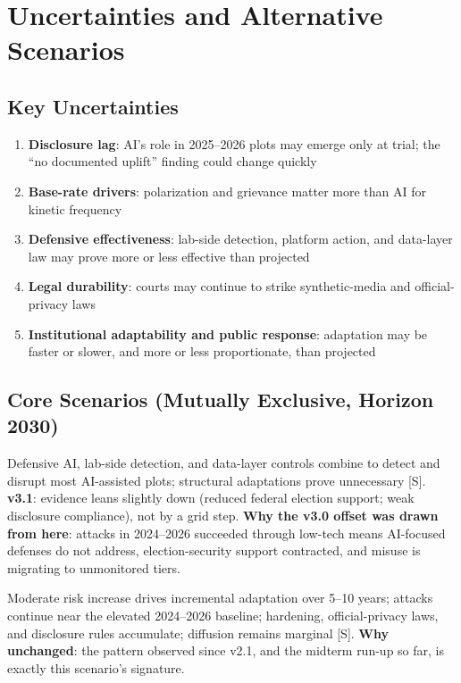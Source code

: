 \documentclass[11pt,letterpaper]{article}
\begin{document}
\section{Uncertainties and Alternative Scenarios}

\subsection{Key Uncertainties}

\begin{enumerate}
  \item \textbf{Disclosure lag}: AI's role in 2025--2026 plots may emerge only at trial; the ``no documented uplift'' finding could change quickly
  \item \textbf{Base-rate drivers}: polarization and grievance matter more than AI for kinetic frequency
  \item \textbf{Defensive effectiveness}: lab-side detection, platform action, and data-layer law may prove more or less effective than projected
  \item \textbf{Legal durability}: courts may continue to strike synthetic-media and official-privacy laws
  \item \textbf{Institutional adaptability and public response}: adaptation may be faster or slower, and more or less proportionate, than projected
\end{enumerate}

\subsection{Core Scenarios (Mutually Exclusive, Horizon 2030)}

\begin{scenariobox}
Defensive AI, lab-side detection, and data-layer controls combine to detect and disrupt most AI-assisted plots; structural adaptations prove unnecessary [S]. \textbf{v3.1}: evidence leans slightly down (reduced federal election support; weak disclosure compliance), not by a grid step. \textbf{Why the v3.0 offset was drawn from here}: attacks in 2024--2026 succeeded through low-tech means AI-focused defenses do not address, election-security support contracted, and misuse is migrating to unmonitored tiers.
\end{scenariobox}

\begin{scenariobox}
Moderate risk increase drives incremental adaptation over 5--10 years; attacks continue near the elevated 2024--2026 baseline; hardening, official-privacy laws, and disclosure rules accumulate; diffusion remains marginal [S]. \textbf{Why unchanged}: the pattern observed since v2.1, and the midterm run-up so far, is exactly this scenario's signature.
\end{scenariobox}
\end{document}
